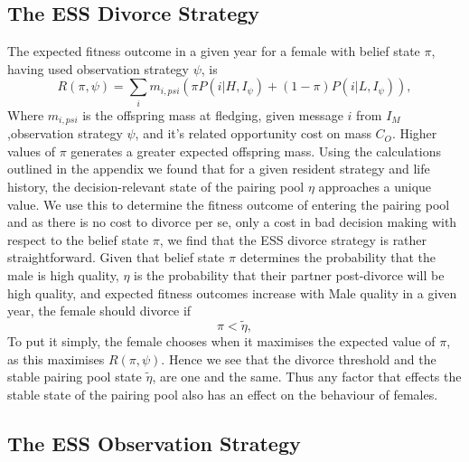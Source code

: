 \documentclass[10pt]{article} %
\begin{document}
\subsection{The ESS Divorce Strategy}
The expected fitness outcome in a given year for a female with belief state $\pi$, having used observation strategy $\psi$, is
\begin{equation}
	R(\pi,\psi)=\underset{i}{\sum}m_{i,psi}(\pi P(i|H,I_\psi)+(1-\pi)P(i|L,I_\psi)),\label{eq:16}
\end{equation}
Where $m_{i,psi}$ is the offspring mass at fledging, given message $i$ from $I_M$,observation strategy $\psi$, and it's related opportunity cost on mass $C_O$. Higher values of $\pi$ generates a greater expected offspring mass. Using the calculations outlined in the appendix we found that for a given resident strategy and life history, the decision-relevant state of the pairing pool $\eta$ approaches a unique value. We use this to determine the fitness outcome of entering the pairing pool and as there is no cost to divorce per se, only a cost in bad decision making with respect to the belief state $\pi$, we find that the ESS divorce strategy is rather straightforward. Given that belief state $\pi$ determines the probability that the male is high quality, $\eta$ is the probability that their partner post-divorce will be high quality, and expected fitness outcomes increase with Male quality in a given year, the female should divorce if 
\[
\pi<\tilde{\eta},
\]
To put it simply, the female chooses when it maximises the expected value of $\pi$, as this maximises $R(\pi,\psi)$. Hence we see that the divorce threshold and the stable pairing pool state $\tilde{\eta}$, are one and the same. Thus any factor that effects the stable state of the pairing pool also has an effect on the behaviour of females.
 

\subsection{The ESS Observation Strategy}
\end{document}
